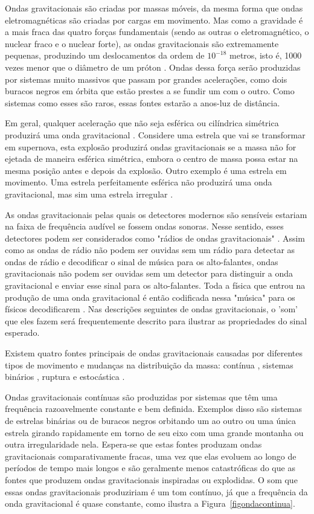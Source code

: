 Ondas gravitacionais são criadas por massas móveis, da mesma forma que ondas eletromagnéticas são criadas por cargas em movimento. Mas como a gravidade é a mais fraca das quatro forças fundamentais (sendo as outras o eletromagnético, o nuclear fraco e o nuclear forte), as ondas gravitacionais são extremamente pequenas, produzindo um deslocamentos da ordem de \(10^{-18}\) metros, isto é, 1000 vezes menor que o diâmetro de um próton \cite{abbott2016observation}. Ondas dessa força serão produzidas por sistemas muito massivos que passam por grandes acelerações, como dois buracos negros em órbita que estão prestes a se fundir um com o outro. Como sistemas como esses são raros, essas fontes estarão a anos-luz de distância.

Em geral, qualquer aceleração que não seja esférica ou cilíndrica simétrica produzirá uma onda gravitacional \cite{abbott2017gw170814}. Considere uma estrela que vai se transformar em supernova, esta explosão produzirá ondas gravitacionais se a massa não for ejetada de maneira esférica simétrica, embora o centro de massa possa estar na mesma posição antes e depois da explosão. Outro exemplo é uma estrela em movimento. Uma estrela perfeitamente esférica não produzirá uma onda gravitacional, mas sim uma estrela irregular \cite{abbott2017gw170817}.

As ondas gravitacionais pelas quais os detectores modernos são sensíveis estariam na faixa de frequência audível se fossem ondas sonoras. Nesse sentido, esses detectores podem ser considerados como "rádios de ondas gravitacionais" \cite{ligo2016gw151226}. Assim como as ondas de rádio não podem ser ouvidas sem um rádio para detectar as ondas de rádio e decodificar o sinal de música para os alto-falantes, ondas gravitacionais não podem ser ouvidas sem um detector para distinguir a onda gravitacional e enviar esse sinal para os alto-falantes. Toda a física que entrou na produção de uma onda gravitacional é então codificada nessa "música" para os físicos decodificarem \cite{ligo2016gw151226}. Nas descrições seguintes de ondas gravitacionais, o 'som' que eles fazem será frequentemente descrito para ilustrar as propriedades do sinal esperado. 

Existem quatro fontes principais de ondas gravitacionais causadas por diferentes tipos de movimento e mudanças na distribuição da massa: contínua , sistemas binários , ruptura e estocástica \cite{ligo2016gw151226}.

Ondas gravitacionais contínuas são produzidas por sistemas que têm uma frequência razoavelmente constante e bem definida. Exemplos disso são sistemas de estrelas binárias ou de buracos negros orbitando um ao outro ou uma única estrela girando rapidamente em torno de seu eixo com uma grande montanha ou outra irregularidade nela. Espera-se que estas fontes produzam ondas gravitacionais comparativamente fracas, uma vez que elas evoluem ao longo de períodos de tempo mais longos e são geralmente menos catastróficas do que as fontes que produzem ondas gravitacionais inspiradas ou explodidas. O som que essas ondas gravitacionais produziriam é um tom contínuo, já que a frequência da onda gravitacional é quase constante, como ilustra a Figura~\ref{figondacontinua}.

